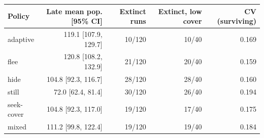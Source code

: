 \begin{tabular}{lrrrr}
\toprule
Policy & Late mean pop. [95\% CI] & Extinct runs & Extinct, low cover & CV (surviving) \\
\midrule
adaptive & 119.1 [107.9, 129.7] & 10/120 & 10/40 & 0.169 \\
flee & 120.8 [108.2, 132.9] & 21/120 & 20/40 & 0.159 \\
hide & 104.8 [92.3, 116.7] & 28/120 & 28/40 & 0.160 \\
still & 72.0 [62.4, 81.4] & 30/120 & 26/40 & 0.194 \\
seek-cover & 104.8 [92.3, 117.0] & 19/120 & 17/40 & 0.175 \\
mixed & 111.2 [99.8, 122.4] & 19/120 & 19/40 & 0.184 \\
\bottomrule
\end{tabular}
